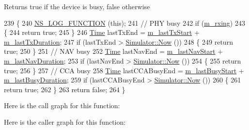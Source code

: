 \begin{DoxyReturn}{Returns}
true if the device is busy, false otherwise 
\end{DoxyReturn}

\begin{DoxyCode}
239 \{
240   \hyperlink{log-macros-disabled_8h_a90b90d5bad1f39cb1b64923ea94c0761}{NS\_LOG\_FUNCTION} (\textcolor{keyword}{this});
241   \textcolor{comment}{// PHY busy}
242   \textcolor{keywordflow}{if} (\hyperlink{classns3_1_1DcfManager_a4826eeefd00a05de3377987c4ce71969}{m\_rxing})
243     \{
244       \textcolor{keywordflow}{return} \textcolor{keyword}{true};
245     \}
246   \hyperlink{namespacens3_1_1TracedValueCallback_a7ffd3e7c142ffe7c8a1d2db9b8de38ec}{Time} lastTxEnd = \hyperlink{classns3_1_1DcfManager_abaae67a660545bd187548f4cc349b8fd}{m\_lastTxStart} + \hyperlink{classns3_1_1DcfManager_ac64d741d745e0cc4930e58a0cee5be31}{m\_lastTxDuration};
247   \textcolor{keywordflow}{if} (lastTxEnd > \hyperlink{classns3_1_1Simulator_ac3178fa975b419f7875e7105be122800}{Simulator::Now} ())
248     \{
249       \textcolor{keywordflow}{return} \textcolor{keyword}{true};
250     \}
251   \textcolor{comment}{// NAV busy}
252   \hyperlink{namespacens3_1_1TracedValueCallback_a7ffd3e7c142ffe7c8a1d2db9b8de38ec}{Time} lastNavEnd = \hyperlink{classns3_1_1DcfManager_a9b355425c50b92120b02980aedd14c8b}{m\_lastNavStart} + \hyperlink{classns3_1_1DcfManager_ac1345fd3e89ee2e0acb0665082669af7}{m\_lastNavDuration};
253   \textcolor{keywordflow}{if} (lastNavEnd > \hyperlink{classns3_1_1Simulator_ac3178fa975b419f7875e7105be122800}{Simulator::Now} ())
254     \{
255       \textcolor{keywordflow}{return} \textcolor{keyword}{true};
256     \}
257   \textcolor{comment}{// CCA busy}
258   \hyperlink{namespacens3_1_1TracedValueCallback_a7ffd3e7c142ffe7c8a1d2db9b8de38ec}{Time} lastCCABusyEnd = \hyperlink{classns3_1_1DcfManager_a0f8af7e80b542ad84de4f9275e41806b}{m\_lastBusyStart} + \hyperlink{classns3_1_1DcfManager_adb6bad3b77a9c74b3c0e206ddcce066b}{m\_lastBusyDuration};
259   \textcolor{keywordflow}{if} (lastCCABusyEnd > \hyperlink{classns3_1_1Simulator_ac3178fa975b419f7875e7105be122800}{Simulator::Now} ())
260     \{
261       \textcolor{keywordflow}{return} \textcolor{keyword}{true};
262     \}
263   \textcolor{keywordflow}{return} \textcolor{keyword}{false};
264 \}
\end{DoxyCode}


Here is the call graph for this function\+:




Here is the caller graph for this function\+:


